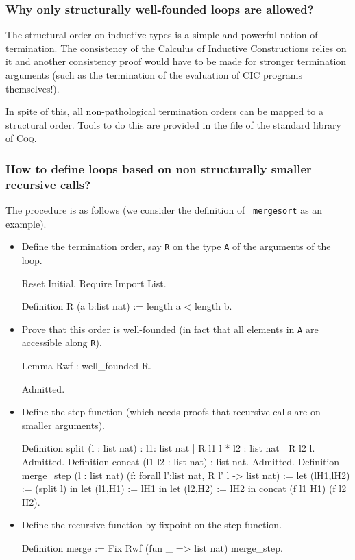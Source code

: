 \documentclass[a4paper,pdftex]{article}
\def\Question#1{\stepcounter{question}\subsubsection{#1}}
\def\Coq{\textsc{Coq}}
\newcommand\vfile[2]{\ahref{#1}{\tt {#2}.v}}
\begin{document}
\Question{Why only structurally well-founded loops are allowed?}

 The structural order on inductive types is a simple and
powerful notion of termination. The consistency of the Calculus of
Inductive Constructions relies on it and another consistency proof
would have to be made for stronger termination arguments (such
as the termination of the evaluation of CIC programs themselves!).

In spite of this, all non-pathological termination orders can be mapped
to a structural order. Tools to do this are provided in the file 
\vfile{\InitWf}{Wf} of the standard library of {\Coq}.

\Question{How to define loops based on non structurally smaller
recursive calls?}

 The procedure is as follows (we consider the definition of {\tt
mergesort} as an example).

\begin{itemize}

\item Define the termination order, say {\tt R} on the type {\tt A} of
the arguments of the loop.

\begin{coq_eval}
Reset Initial.
Require Import List.
\end{coq_eval}

\begin{coq_example*}
Definition R (a b:list nat) := length a < length b.
\end{coq_example*}

\item Prove that this order is well-founded (in fact that all elements in {\tt A} are accessible along {\tt R}).

\begin{coq_example*}
Lemma Rwf : well_founded R.
\end{coq_example*}
\begin{coq_eval}
Admitted.
\end{coq_eval}

\item Define the step function (which needs proofs that recursive
calls are on smaller arguments).

\begin{coq_example*}
Definition split (l : list nat)
   : {l1: list nat | R l1 l} * {l2 : list nat | R l2 l}.
Admitted.
Definition concat (l1 l2 : list nat) : list nat.
Admitted.
Definition merge_step (l : list nat) (f: forall l':list nat, R l' l -> list nat) :=
  let (lH1,lH2) := (split l) in
  let (l1,H1) := lH1 in
  let (l2,H2) := lH2 in
  concat (f l1 H1) (f l2 H2).
\end{coq_example*}

\item Define the recursive function by fixpoint on the step function.

\begin{coq_example*}
Definition merge := Fix Rwf (fun _ => list nat) merge_step.
\end{coq_example*}

\end{itemize}
\end{document}
